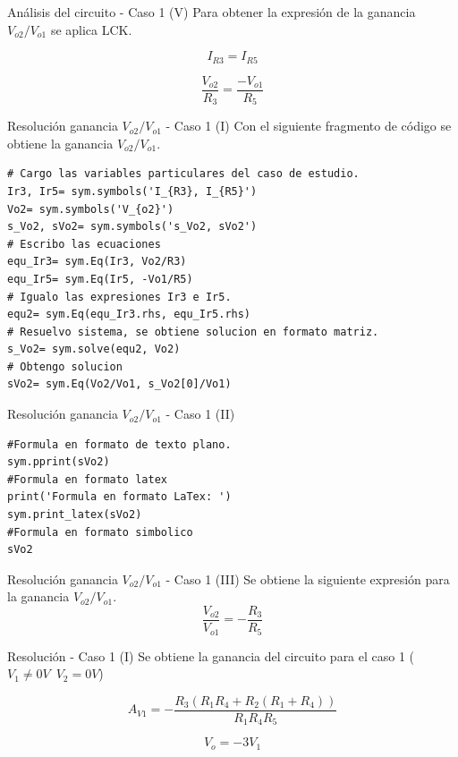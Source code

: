 \documentclass[14pt, aspectratio= 169]{beamer}
\begin{document}
% 
\begin{frame}{Análisis del circuito - Caso 1 (V)}
Para obtener la expresión de la ganancia $V_{o2}/V_{o1}$ se aplica LCK.

$$ I_{R3}= I_{R5} $$

$$ \frac{V_{o2}}{R_{3}} = \frac{-V_{o1}}{R_{5}} $$

\end{frame}

% 
\begin{frame}[fragile]{Resolución ganancia $V_{o2}/ V_{o1}$ - Caso 1 (I)}
Con el siguiente fragmento de código se obtiene la ganancia $V_{o2}/V_{o1}$. 
\begin{lstlisting}[style=python]
# Cargo las variables particulares del caso de estudio.
Ir3, Ir5= sym.symbols('I_{R3}, I_{R5}')
Vo2= sym.symbols('V_{o2}')
s_Vo2, sVo2= sym.symbols('s_Vo2, sVo2')
# Escribo las ecuaciones
equ_Ir3= sym.Eq(Ir3, Vo2/R3)
equ_Ir5= sym.Eq(Ir5, -Vo1/R5)
# Igualo las expresiones Ir3 e Ir5.
equ2= sym.Eq(equ_Ir3.rhs, equ_Ir5.rhs)
# Resuelvo sistema, se obtiene solucion en formato matriz.
s_Vo2= sym.solve(equ2, Vo2)
# Obtengo solucion
sVo2= sym.Eq(Vo2/Vo1, s_Vo2[0]/Vo1)
\end{lstlisting}

\end{frame}

% 

\begin{frame}[fragile]{Resolución ganancia $V_{o2}/ V_{o1}$ - Caso 1 (II)}
\begin{lstlisting}[style=python]
#Formula en formato de texto plano.
sym.pprint(sVo2)
#Formula en formato latex
print('Formula en formato LaTex: ')
sym.print_latex(sVo2)
#Formula en formato simbolico
sVo2
\end{lstlisting}
\end{frame}

% 

\begin{frame}{Resolución ganancia $V_{o2}/V_{o1}$ - Caso 1 (III)}
Se obtiene la siguiente expresión para la ganancia $V_{o2}/V_{o1}$.
$$ \boxed{ \frac{V_{o2}}{V_{o1}}= -\frac{R_{3}}{R_{5}} } $$
\end{frame}

% 
\begin{frame}{Resolución - Caso 1 (I)}
Se obtiene la ganancia del circuito para el caso 1 ($V_{1}\neq 0V \, \, \, V_{2}=0V$)

$$ \boxed{ A_{V1} = - \frac{R_{3} \left(R_{1} R_{4} + R_{2} \left(R_{1} + R_{4}\right)\right)}{R_{1} R_{4} R_{5}} } $$

$$ \boxed{ V_{o}= -3 V_{1} } $$
\end{frame}
\end{document}
